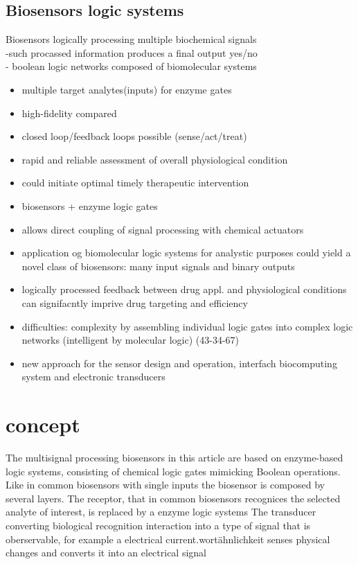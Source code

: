 \documentclass[runningheads]{llncs}
\begin{document}
\subsection{Biosensors  logic systems}
Biosensors logically processing multiple biochemical signals\\
-such procassed information produces a final output yes/no \\
- boolean logic networks composed of biomolecular systems\\	
\begin{itemize}
	\item multiple target analytes(inputs) for enzyme gates
	\item high-fidelity compared
	\item closed loop/feedback loops possible (sense/act/treat)
	\item rapid and reliable assessment of overall physiological condition
	\item could initiate optimal timely therapeutic intervention
	\item biosensors + enzyme logic gates
	\item allows direct coupling of signal processing with chemical actuators 
	\item application og biomolecular logic systems for analystic purposes could yield a novel class of biosensors: many input signals and binary outputs
	\item logically processed feedback between drug appl. and physiological conditions can signifacntly imprive drug targeting and efficiency 
	
	\item difficulties: complexity by assembling individual logic gates into complex logic networks (intelligent by molecular logic) (43-34-67)
	\item new approach for the sensor design and operation, interfach biocomputing system and electronic transducers
\end{itemize}


\section{concept}

The multisignal processing biosensors in this article are based on enzyme-based logic systems, consisting of chemical logic gates mimicking Boolean operations. Like in common biosensors with single inputs the biosensor is composed by several layers. The receptor, that in common biosensors recognices the selected analyte of interest, is replaced by a enzyme logic systems
The transducer converting biological recognition interaction into a type of signal that is oberservable, for example a electrical current.wortähnlichkeit senses physical changes and converts it into an electrical signal
\end{document}
